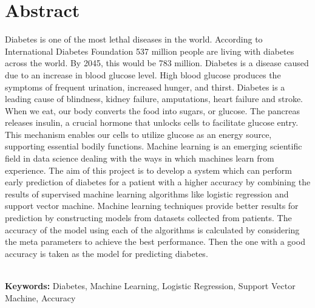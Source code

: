\chapter*{\center \Large  Abstract}

Diabetes is one of the most lethal diseases in the world. According to International Diabetes Foundation 537 million people are living with diabetes across the world. By 2045, this would be 783 million. Diabetes is a disease caused due to an increase in blood glucose level. High blood glucose produces the symptoms of frequent urination, increased hunger, and thirst. Diabetes is a leading cause of blindness, kidney failure, amputations, heart failure and stroke. When we eat, our body converts the food into sugars, or glucose. The pancreas releases insulin, a crucial hormone that unlocks cells to facilitate glucose entry. This mechanism enables our cells to utilize glucose as an energy source, supporting essential bodily functions. Machine learning is an emerging scientific field in data science dealing with the ways in which machines learn from experience. The aim of this project is to develop a system which can perform early prediction of diabetes for a patient with a higher accuracy by combining the results of supervised machine learning algorithms like logistic regression and support vector machine. Machine learning techniques provide better results for prediction by constructing models from datasets collected from patients. The accuracy of the model using each of the algorithms is calculated by considering the meta parameters to achieve the best performance. Then the one with a good accuracy is taken as the model for predicting diabetes.



~\\[1cm]
\noindent %
\textbf{Keywords:} Diabetes, Machine Learning, Logistic Regression, Support Vector Machine, Accuracy

